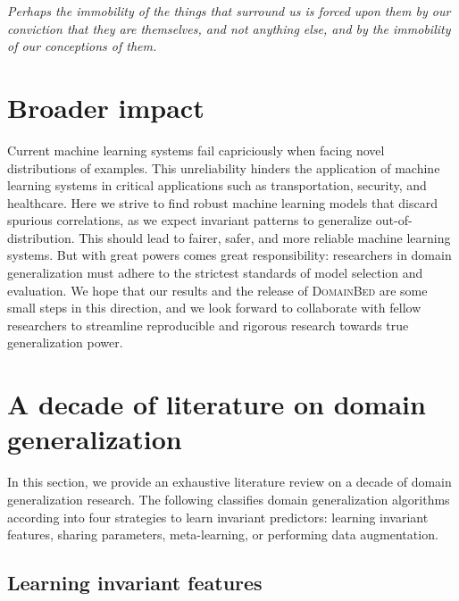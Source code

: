 \documentclass{article}
\newcommand{\domainbed}{\textsc{DomainBed}\xspace}
\begin{document}
\begin{center}
\textit{Perhaps the immobility of the things that surround us is forced upon them by our conviction that they are themselves, and not anything else, and by the immobility of our conceptions of them.}
\end{center}

\section*{Broader impact}

Current machine learning systems fail capriciously when facing novel distributions of examples.
%
This unreliability hinders the application of machine learning systems in critical applications such as transportation, security, and healthcare.
%
Here we strive to find robust machine learning models that discard spurious correlations, as we expect invariant patterns to generalize out-of-distribution. 
%
This should lead to fairer, safer, and more reliable machine learning systems.
%
But with great powers comes great responsibility: researchers in domain generalization must adhere to the strictest standards of model selection and evaluation.
%
We hope that our results and the release of \domainbed are some small steps in this direction, and we look forward to collaborate with fellow researchers to streamline reproducible and rigorous research towards true generalization power.




\clearpage
\newpage
\appendix

\section{A decade of literature on domain generalization}

In this section, we provide an exhaustive literature review on a decade of domain generalization research.
%
The following classifies domain generalization algorithms according into four strategies to learn invariant predictors: learning invariant features, sharing parameters, meta-learning, or performing data augmentation.

\subsection{Learning invariant features}
\end{document}
